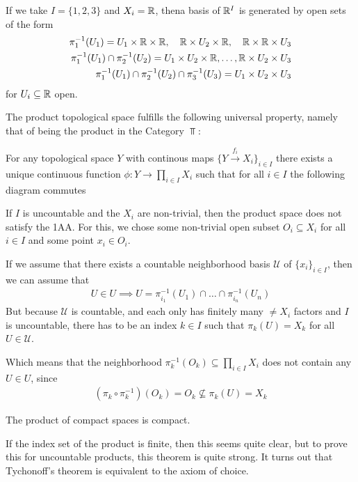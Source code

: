 \begin{ex}[]
If we take $I = \{1,2,3\}$ and $X_i = \mathbb{R}$, thena basis of $\mathbb{R}^{I}$ is generated by open sets of the form
\begin{align*}
  \pi_1^{-1}(U_1) = U_1 \times \mathbb{R} \times \mathbb{R}, \quad
  \mathbb{R} \times U_2 \times \mathbb{R}, 
  \quad
  \mathbb{R} \times \mathbb{R} \times U_3\\
  \pi_1^{-1}(U_1) \cap \pi_2^{-1}(U_2) = U_1 \times U_2 \times \mathbb{R}, \ldots, \mathbb{R} \times U_2 \times U_3\\
  \pi_1^{-1}(U_1) \cap \pi_2^{-1}(U_2) \cap \pi_3^{-1}(U_3) = U_1 \times U_2 \times U_3
\end{align*}
for $U_i \subseteq \mathbb{R}$ open.
\end{ex}

The product topological space fulfills the following universal property, namely that of being the product in the Category $\Top$:

For any topological space $Y$ with continous maps $\{Y \stackrel{f_i}{\to}X_i\}_{i \in I}$ there exists a unique continuous function $\phi: Y \to  \prod_{i \in I}X_i$ such that for all $i \in I$ the following diagram commutes

\begin{center}
\end{center}


\begin{ex}[]
If $I$ is uncountable and the $X_i$ are non-trivial, then the product space does not satisfy the 1AA.
For this, we chose some non-trivial open subset $O_i \subseteq X_i$ for all $i \in I$ and some point $x_i \in O_i$.

If we assume that there exists a countable neighborhood basis $\mathcal{U}$ of $\{x_i\}_{i \in I}$, then we can assume that
\begin{align*}
  U \in U \implies U = \pi_{i_1}^{-1}(U_1) \cap \ldots \cap \pi_{i_n}^{-1}(U_n)
\end{align*}
But because $\mathcal{U}$ is countable, and each only has finitely many $\neq X_i$ factors and $I$ is uncountable,
there has to be an index $k \in I$ such that $\pi_k(U) = X_k$ for all $U \in \mathcal{U}$.

Which means that the neighborhood $\pi_k^{-1}(O_k) \subseteq \prod_{i \in I}X_i$ does not contain any $U \in U$, since
\begin{align*}
  (\pi_k \circ \pi_k^{-1})(O_k) = O_k \nsubseteq \pi_k(U) = X_k
\end{align*}
\end{ex}
\begin{thm}[Tychonoff]
The product of compact spaces is compact.
\end{thm}
If the index set of the product is finite, then this seems quite clear, but to prove this for uncountable products, this theorem is quite strong.
It turns out that Tychonoff's theorem is equivalent to the axiom of choice.

